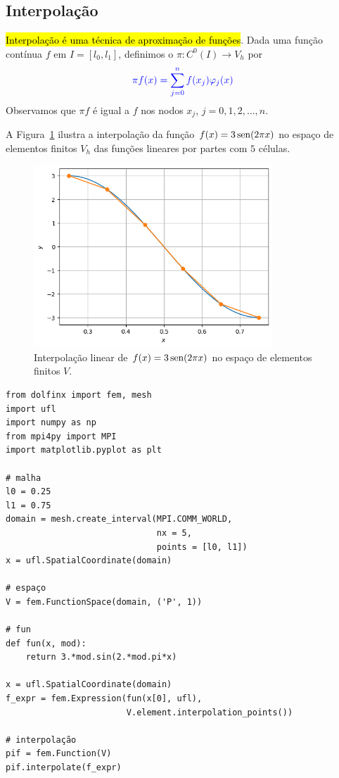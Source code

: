 \subsection{Interpolação}
\badgeRevisar

\hl{Interpolação é uma técnica de aproximação de funções}. Dada uma função contínua $f$ em $I=[l_0, l_1]$, definimos o  $\pi: C^0(I)\to V_h$ por
\begin{equation}\color{blue}\pi f (x) = \sum_{j=0}^{n}f(x_j)\varphi_j(x)
\end{equation}
Observamos que $\pi f$ é igual a $f$ nos nodos $x_j$, $j=0, 1, 2, \dotsc, n$. 

\begin{ex}\label{ex:mef1d_interp_lin}
  A Figura~\ref{fig:ex_mef1d_interp_lin} ilustra a interpolação da função $f(x)=3\operatorname{sen}(2\pi x)$ no espaço de elementos finitos $V_h$ das funções lineares por partes com $5$ células.

  \begin{figure}[H]
    \centering
    \includegraphics[width=0.8\textwidth]{./cap_mef1d/dados/ex_mef1d_interp_lin/fig}
    \caption{Interpolação linear de $f(x)=3\operatorname{sen}(2\pi x)$ no espaço de elementos finitos $V$.}
    \label{fig:ex_mef1d_interp_lin}
  \end{figure}


\begin{lstlisting}[caption=mef1d\_interp\_lin]
from dolfinx import fem, mesh
import ufl
import numpy as np
from mpi4py import MPI
import matplotlib.pyplot as plt

# malha
l0 = 0.25
l1 = 0.75
domain = mesh.create_interval(MPI.COMM_WORLD,
                              nx = 5,
                              points = [l0, l1])
x = ufl.SpatialCoordinate(domain)

# espaço
V = fem.FunctionSpace(domain, ('P', 1))

# fun
def fun(x, mod):
    return 3.*mod.sin(2.*mod.pi*x)

x = ufl.SpatialCoordinate(domain)
f_expr = fem.Expression(fun(x[0], ufl),
                        V.element.interpolation_points())

# interpolação
pif = fem.Function(V)
pif.interpolate(f_expr)
\end{lstlisting}
\end{ex}

